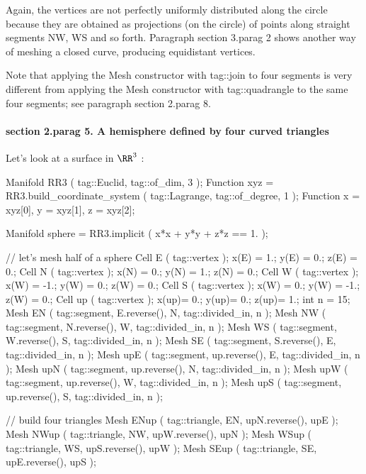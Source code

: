 Again, the vertices are not perfectly uniformly distributed along the circle
because they are obtained as projections (on the circle) of points along straight segments
{\codett NW}, {\codett WS} and so forth.
Paragraph \numb section 3.\numb parag 2 shows another way of meshing a closed curve,
producing equidistant vertices.

Note that applying the {\codett Mesh} constructor with {\codett tag::join} to four segments
is very different from applying the {\codett Mesh} constructor with {\codett tag::quadrangle}
to the same four segments; see paragraph \numb section 2.\numb parag 8.


\paragraph{\numb section 2.\numb parag 5. A hemisphere defined by four curved triangles}

Let's look at a surface in $ \RR^3 $ :

\verbatim
   Manifold RR3 ( tag::Euclid, tag::of_dim, 3 );
   Function xyz = RR3.build_coordinate_system ( tag::Lagrange, tag::of_degree, 1 );
   Function x = xyz[0],  y = xyz[1],  z = xyz[2];

   Manifold sphere = RR3.implicit ( x*x + y*y + z*z == 1. );

   // let's mesh half of a sphere
   Cell E  ( tag::vertex );   x(E) =  1.;   y(E) =  0.;   z(E) = 0.;
   Cell N  ( tag::vertex );   x(N) =  0.;   y(N) =  1.;   z(N) = 0.;
   Cell W  ( tag::vertex );   x(W) = -1.;   y(W) =  0.;   z(W) = 0.;
   Cell S  ( tag::vertex );   x(W) =  0.;   y(W) = -1.;   z(W) = 0.;
   Cell up ( tag::vertex );   x(up)=  0.;   y(up)=  0.;   z(up)= 1.;
   int n = 15;
   Mesh EN ( tag::segment, E.reverse(), N, tag::divided_in, n );
   Mesh NW ( tag::segment, N.reverse(), W, tag::divided_in, n );
   Mesh WS ( tag::segment, W.reverse(), S, tag::divided_in, n );
   Mesh SE ( tag::segment, S.reverse(), E, tag::divided_in, n );
   Mesh upE ( tag::segment, up.reverse(), E, tag::divided_in, n );
   Mesh upN ( tag::segment, up.reverse(), N, tag::divided_in, n );
   Mesh upW ( tag::segment, up.reverse(), W, tag::divided_in, n );
   Mesh upS ( tag::segment, up.reverse(), S, tag::divided_in, n );
\endverbatim
\vfil\eject

\verbatim
   // build four triangles
   Mesh ENup ( tag::triangle, EN, upN.reverse(), upE );
   Mesh NWup ( tag::triangle, NW, upW.reverse(), upN );
   Mesh WSup ( tag::triangle, WS, upS.reverse(), upW );
   Mesh SEup ( tag::triangle, SE, upE.reverse(), upS );

